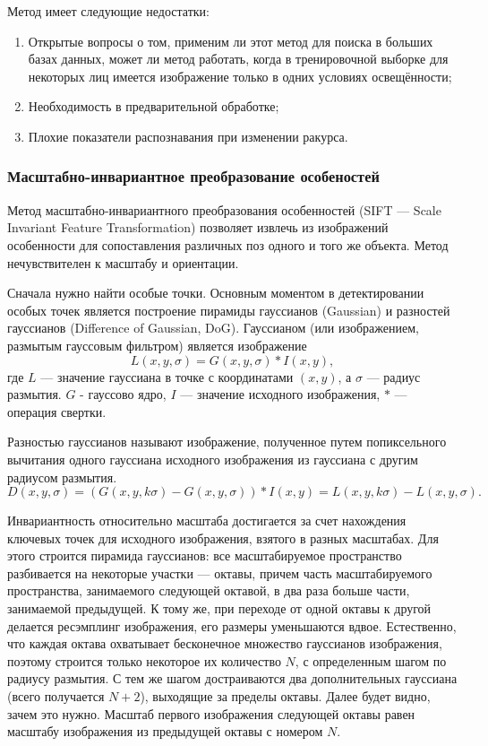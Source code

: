 Метод имеет следующие недостатки:
\begin{enumerate}
\item Открытые вопросы о том, применим ли этот метод для поиска в
больших базах данных, может ли метод работать, когда в тренировочной выборке для
некоторых лиц имеется изображение только в одних условиях освещённости;
\item Необходимость в предварительной обработке;
\item Плохие показатели распознавания при изменении ракурса.
\end{enumerate}



\subsubsection{Масштабно-инвариантное преобразование особеностей}

Метод масштабно-инвариантного преобразования особенностей (SIFT --- Scale
In\-va\-ri\-ant Feature Transformation) позволяет извлечь из изображений особенности
для сопоставления различных поз одного и того же объекта. Метод нечувствителен
к масштабу и ориентации.


Сначала нужно найти особые точки. Основным моментом в детектировании особых
точек является построение пирамиды гауссианов (Gaussian) и разностей гауссианов
(Difference of Gaussian, DoG). Гауссианом (или изображением, размытым гауссовым
фильтром) является изображение
$$ L(x,y,\sigma) = G(x,y,\sigma) \ast I(x,y), $$
где $L$ --- значение гауссиана в точке с координатами $(x,y)$, а $\sigma$ ---
радиус размытия. $G$ - гауссово ядро, $I$ --- значение исходного изображения,
$\ast$ --- операция свертки.


Разностью гауссианов называют изображение, полученное путем попиксельного
вычитания одного гауссиана исходного изображения из гауссиана с другим радиусом
размытия.
$$ D(x,y,\sigma) = (G(x,y,k\sigma) - G(x,y,\sigma)) \ast I(x,y) = L(x,y,k\sigma) - L(x,y,\sigma). $$


Инвариантность относительно масштаба достигается за счет нахождения ключевых
точек для исходного изображения, взятого в разных масштабах. Для этого строится
пирамида гауссианов: все масштабируемое пространство разбивается на некоторые
участки — октавы, причем часть масштабируемого пространства, занимаемого
следующей октавой, в два раза больше части, занимаемой предыдущей. К тому же,
при переходе от одной октавы к другой делается ресэмплинг изображения, его
размеры уменьшаются вдвое. Естественно, что каждая октава охватывает бесконечное
множество гауссианов изображения, поэтому строится только некоторое их
количество $N$, с определенным шагом по радиусу размытия. С тем же шагом
достраиваются два дополнительных гауссиана (всего получается $N+2$), выходящие
за пределы октавы. Далее будет видно, зачем это нужно. Масштаб первого
изображения следующей октавы равен масштабу изображения из предыдущей октавы с
номером $N$.


